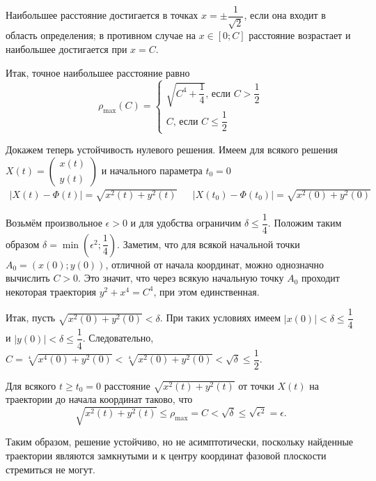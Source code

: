 \documentclass[a5paper,10pt]{article}
\newcommand{\br}[1]{\left(#1\right)}
\newcommand{\vbr}[1]{\left|#1\right|}
\newcommand{\rbr}[1]{\left[#1\right]}
\renewcommand{\le}{\leqslant}
\renewcommand{\ge}{\geqslant}
\begin{document}
Наибольшее расстояние достигается в точках \linebreak $x = \pm \dfrac {1} {\sqrt{2}}$, если она входит в область определения; в противном случае на $x \in \rbr{0; C}$ расстояние возрастает и наибольшее достигается при $x = C$.

Итак, точное наибольшее расстояние равно
$$\rho_{\max}\br{C} =  \begin{cases} \sqrt{C^4 + \dfrac {1} {4}}\text{, если } C > \dfrac {1} {2} \\ C \text{, если } C \le \dfrac {1}{2} \end{cases}$$

\vspace{2.5cm}

Докажем теперь устойчивость нулевого решения. Имеем для всякого решения \linebreak $X\br{t} = \begin{pmatrix} x\br{t} \\ y\br{t} \end{pmatrix}$ и начального параметра $t_{0} = 0$
\begin{align*}
\vbr{X\br{t} - \Phi\br{t}} = \sqrt{x^2\br{t} + y^2\br{t}} && \vbr{X\br{t_0} - \Phi\br{t_0}} = \sqrt{x^2\br{0} + y^2\br{0}}
\end{align*}

Возьмём произвольное $\epsilon > 0$ и для удобства ограничим $\delta \le \dfrac {1} {4}$. Положим таким образом $\delta = \min\br{\epsilon^2; \dfrac {1} {4}}$. Заметим, что для всякой начальной точки $A_{0} = \br{x\br{0}; y\br{0}}$, отличной от начала координат, можно однозначно вычислить $C > 0$. Это значит, что через всякую начальную точку $A_{0}$ проходит некоторая траектория $y^2 + x^4 = C^4$, при этом единственная.

Итак, пусть $\sqrt{x^2\br{0} + y^2\br{0}} < \delta$. При таких условиях имеем $\vbr{x\br{0}} < \delta \le \dfrac {1} {4}$ и \linebreak $\vbr{y\br{0}} < \delta \le \dfrac {1} {4}$. Следовательно, $C = \sqrt[4]{x^4\br{0} + y^2\br{0}} < \sqrt[4]{x^2\br{0} + y^2\br{0}} < \sqrt{\delta} \le \dfrac {1} {2}$.

Для всякого $t \ge t_{0} = 0$ расстояние $\sqrt{x^2\br{t} + y^2\br{t}}$ от точки $X\br{t}$ на траектории до начала координат таково, что
$$\sqrt{x^2\br{t} + y^2\br{t}} \le \rho_{\max} = C < \sqrt{\delta} \le \sqrt{\epsilon^2} = \epsilon.$$

Таким образом, решение устойчиво, но не асимптотически, поскольку найденные траектории являются замкнутыми и к центру координат фазовой плоскости стремиться не могут.
\end{document}
